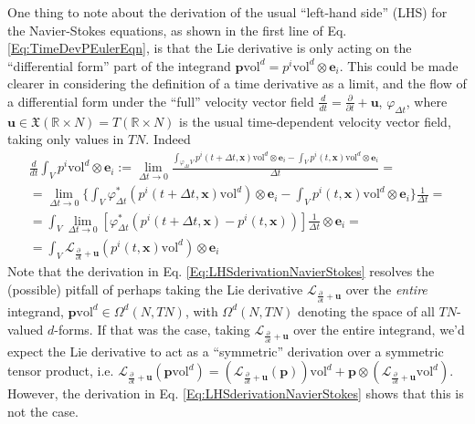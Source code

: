 \documentclass[10pt]{amsart}
\begin{document}
\begin{multicols*}{2}
One thing to note about the derivation of the usual ``left-hand side'' (LHS) for the Navier-Stokes equations, as shown in the first line of Eq. \ref{Eq:TimeDevPEulerEqn}, is that the Lie derivative is only acting on the ``differential form'' part of the integrand $\mathbf{p} \text{vol}^d = p^i \text{vol}^d \otimes \mathbf{e}_i$.  This could be made clearer in considering the definition of a time derivative as a limit, and the flow of a differential form under the ``full'' velocity vector field $\frac{d}{dt} = \frac{ \partial}{ \partial t} + \mathbf{u}$, $\varphi_{\Delta t}$, where $\mathbf{u} \in \mathfrak{X}(\mathbb{R}\times N) = T(\mathbb{R}\times N)$ is the usual time-dependent velocity vector field, taking only values in $TN$.  Indeed
\begin{equation}\label{Eq:LHSderivationNavierStokes}
\begin{gathered}
  \frac{d}{dt} \int_V p^i \text{vol}^d \otimes \mathbf{e}_i := \lim_{\Delta t \to 0 } \frac{ \int_{\varphi_{\Delta t}V} p^i(t+\Delta t,\mathbf{x}) \text{vol}^d \otimes \mathbf{e}_i - \int_V p^i(t,\mathbf{x})\text{vol}^d \otimes \mathbf{e}_i }{ \Delta t} = \\
   = \lim_{\Delta t \to 0} \lbrace \int_{V} \varphi_{\Delta t}^*(p^i(t+\Delta t, \mathbf{x}) \text{vol}^d) \otimes \mathbf{e}_i - \int_Vp^i(t,\mathbf{x})\text{vol}^d \otimes \mathbf{e}_i \rbrace \frac{1}{\Delta t} = \\
   = \int_V \lim_{\Delta t \to 0} \left[ \varphi^*_{\Delta t} (p^i(t+\Delta t,\mathbf{x}) - p^i(t,\mathbf{x}) )\right]\frac{1}{\Delta t} \otimes \mathbf{e}_i =  \\
   = \int_V \mathcal{L}_{\frac{ \partial }{\partial t} + \mathbf{u}}(p^i(t,\mathbf{x}) \text{vol}^d) \otimes \mathbf{e}_i
  \end{gathered}
\end{equation}
Note that the derivation in Eq. \ref{Eq:LHSderivationNavierStokes} resolves the (possible) pitfall of perhaps taking the Lie derivative $\mathcal{L}_{\frac{\partial }{ \partial t} + \mathbf{u}}$ over the \emph{entire} integrand, $\mathbf{p}\text{vol}^d \in \Omega^d(N,TN)$, with $\Omega^d(N,TN)$ denoting the space of all $TN$-valued $d$-forms.  If that was the case, taking $\mathcal{L}_{\frac{\partial}{\partial t} + \mathbf{u}}$ over the entire integrand, we'd expect the Lie derivative to act as a ``symmetric'' derivation over a symmetric tensor product, i.e. $\mathcal{L}_{ \frac{ \partial }{ \partial t} + \mathbf{u} }( \mathbf{p} \text{vol}^d ) = (\mathcal{L}_{\frac{ \partial }{ \partial t} + \mathbf{u} }(\mathbf{p})) \text{vol}^d + \mathbf{p} \otimes (\mathcal{L}_{\frac{ \partial }{ \partial t} + \mathbf{u} } \text{vol}^d )$.  However, the derivation in Eq. \ref{Eq:LHSderivationNavierStokes} shows that this is not the case.  


\end{multicols*}
\end{document}
